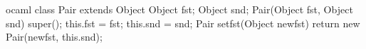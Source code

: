 \begin{cminted}{ocaml}
class Pair extends Object {
    Object fst;
    Object snd;
    Pair(Object fst, Object snd) {
        super(); this.fst = fst; this.snd = snd;
    }
    Pair setfst(Object newfst) {
        return new Pair(newfst, this.snd);
    }
}
\end{cminted}
